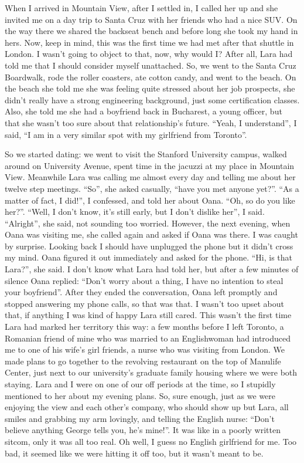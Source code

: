 \documentclass[12pt]{book}
\begin{document}
When I arrived in Mountain View, after I settled in, I called her up and
she invited me on a day trip to Santa Cruz with her friends who had a
nice SUV. On the way there we shared the backseat bench and before long
she took my hand in hers. Now, keep in mind, this was the first time we
had met after that shuttle in London. I wasn't going to object to that,
now, why would I? After all, Lara had told me that I should consider
myself unattached. So, we went to the Santa Cruz Boardwalk, rode the
roller coasters, ate cotton candy, and went to the beach. On the beach
she told me she was feeling quite stressed about her job prospects, she
didn't really have a strong engineering background, just some
certification classes. Also, she told me she had a boyfriend back in
Bucharest, a young officer, but that she wasn't too sure about that
relationship's future. ``Yeah, I understand'', I said, ``I am in a very
similar spot with my girlfriend from Toronto''.

So we started dating: we went to visit the Stanford University campus,
walked around on University Avenue, spent time in the jacuzzi at my
place in Mountain View. Meanwhile Lara was calling me almost every day
and telling me about her twelve step meetings. ``So'', she asked
casually, ``have you met anyone yet?''. ``As a matter of fact, I did!'',
I confessed, and told her about Oana. ``Oh, so do you like her?''.
``Well, I don't know, it's still early, but I don't dislike her'', I
said. ``Alright'', she said, not sounding too worried. However, the next
evening, when Oana was visiting me, she called again and asked if Oana
was there. I was caught by surprise. Looking back I should have
unplugged the phone but it didn't cross my mind. Oana figured it out
immediately and asked for the phone. ``Hi, is that Lara?'', she said. I
don't know what Lara had told her, but after a few minutes of silence
Oana replied: ``Don't worry about a thing, I have no intention to steal
your boyfriend''. After they ended the conversation, Oana left promptly
and stopped answering my phone calls, so that was that. I wasn't too
upset about that, if anything I was kind of happy Lara still cared. This
wasn't the first time Lara had marked her territory this way: a few
months before I left Toronto, a Romanian friend of mine who was married
to an Englishwoman had introduced me to one of his wife's girl friends,
a nurse who was visiting from London. We made plans to go together to
the revolving restaurant on the top of Manulife Center, just next to our
university's graduate family housing where we were both staying. Lara
and I were on one of our off periods at the time, so I stupidly
mentioned to her about my evening plans. So, sure enough, just as we
were enjoying the view and each other's company, who should show up but
Lara, all smiles and grabbing my arm lovingly, and telling the English
nurse: ``Don't believe anything George tells you, he's mine!''. It was
like in a poorly written sitcom, only it was all too real. Oh well, I
guess no English girlfriend for me. Too bad, it seemed like we were
hitting it off too, but it wasn't meant to be.
\end{document}
